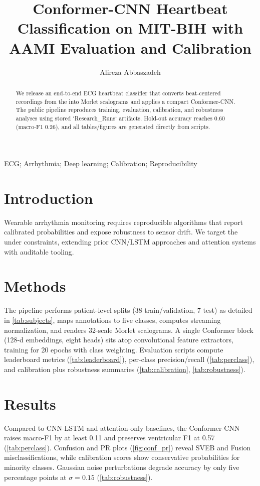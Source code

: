 \documentclass[preprint,3p]{elsarticle}
\begin{document}
\begin{frontmatter}
\title{Conformer-CNN Heartbeat Classification on MIT-BIH with AAMI Evaluation and Calibration}
\author[1]{Alireza Abbaszadeh}
\author[2]{}
\address[1]{Department of Computer Engineering, Ma.C., Islamic Azad University, Mashhad, Iran}
\address[2]{~}
\begin{abstract}
We release an end-to-end ECG heartbeat classifier that converts beat-centered recordings from the \dataset{} into Morlet scalograms and applies a compact Conformer-CNN. The public pipeline reproduces training, evaluation, calibration, and robustness analyses using stored `Research\_Runs` artifacts. Hold-out accuracy reaches 0.60 (macro-F1 0.26), and all tables/figures are generated directly from scripts.
\end{abstract}
\begin{keyword}
ECG; Arrhythmia; Deep learning; Calibration; Reproducibility
\end{keyword}
\end{frontmatter}

\section{Introduction}
Wearable arrhythmia monitoring requires reproducible algorithms that report calibrated probabilities and expose robustness to sensor drift. We target the \dataset{} \cite{moody2001mitbih} under \aami{} constraints, extending prior CNN/LSTM approaches \cite{acharya2017ecgdeep} and attention systems \cite{rajpurkar2017cardiologist} with auditable tooling.

\section{Methods}
The pipeline performs patient-level splits (38 train/validation, 7 test) as detailed in \autoref{tab:subjects}, maps annotations to five \aami{} classes, computes streaming normalization, and renders 32-scale Morlet scalograms. A single Conformer block (128-d embeddings, eight heads) sits atop convolutional feature extractors, training for 20 epochs with class weighting. Evaluation scripts compute leaderboard metrics (\autoref{tab:leaderboard}), per-class precision/recall (\autoref{tab:perclass}), and calibration plus robustness summaries (\autoref{tab:calibration}, \autoref{tab:robustness}).

\section{Results}
Compared to CNN-LSTM and attention-only baselines, the Conformer-CNN raises macro-F1 by at least 0.11 and preserves ventricular F1 at 0.57 (\autoref{tab:perclass}). Confusion and PR plots (\autoref{fig:conf_pr}) reveal SVEB and Fusion misclassifications, while calibration scores show conservative probabilities for minority classes. Gaussian noise perturbations degrade accuracy by only five percentage points at $\sigma{=}0.15$ (\autoref{tab:robustness}).
\end{document}
